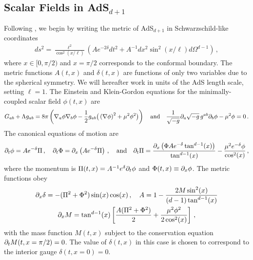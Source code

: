 \documentclass[../PhD.tex]{subfiles}
\begin{document}
\subsection{Scalar Fields in AdS$_{d+1}$}
Following \cite{1508.02709}, we begin by writing the metric of AdS$_{d+1}$ in Schwarzschild-like coordinates 
\begin{align}
ds^2 = \frac{\ell^2}{\cos^2 \left(x / \ell \right)} \left( A e^{-2\delta} dt^2 + A^{-1}dx^2 \sin^2 \left(x / \ell \right) d\Omega^{d-1} \right) \, ,
\end{align}
where $x \in [0, \pi/2)$ and $x = \pi / 2$ corresponds to the conformal boundary. The metric functions $A(t,x)$ and $\delta(t,x)$ are functions of only two variables due to the spherical symmetry. We will hereafter work in units of the AdS length scale, setting $\ell = 1$. The Einstein and Klein-Gordon equations for the minimally-coupled scalar field $\phi(t,x)$ are
\begin{align}
G_{ab} + \Lambda g_{ab} = 8\pi \left( \nabla_a \phi \nabla_b \phi - \frac{1}{2} g_{ab} \big( \left( \nabla \phi \right)^2 + \mu^2 \phi^2 \big) \right) \quad \text{and} \quad \frac{1}{\sqrt{-g}} \partial_a \sqrt{-g} \, g^{ab} \partial_b \phi - \mu^2 \phi = 0 \, .
\end{align}
The canonical equations of motion are \cite{1210.1566}
\begin{align}
\label{canon eqns}
\partial_t \phi = A e^{-\delta} \Pi \, , \quad \partial_t \Phi = \partial_x \left( A e^{-\delta} \Pi \right) \, , \quad \text{and} \quad \partial_t \Pi = \frac{\partial_x \left( \Phi A e^{-\delta} \tan^{d-1} (x) \right)}{\tan^{d-1}(x)} - \frac{\mu^2 e^{-\delta} \phi}{\cos^2 (x)} \, ,
\end{align}
where the momentum is $\Pi(t,x) = A^{-1} e^{\delta} \partial_t \phi$ and $\Phi(t,x) \equiv \partial_x \phi$. The metric functions obey
\begin{align}
\label{metric funcs}
\begin{gathered}
\partial_x \delta = - (\Pi^2 + \Phi^2 ) \sin (x) \cos(x) \, , \quad A = 1 - \frac{2M \sin^2 (x) }{(d-1) \tan^{d-1}(x)} \\
\partial_x M = \tan^{d-1}(x) \left[ \frac{A (\Pi^2 + \Phi^2)}{2} + \frac{\mu^2 \phi^2}{2 \cos^2 (x)} \right] \, ,
\end{gathered}
\end{align}
with the mass function $M(t,x)$ subject to the conservation equation $\partial_t M( t, x = \pi/2) = 0$. The value of $\delta(t,x)$ in this case is chosen to correspond to the interior gauge $\delta(t,x=0) = 0$. 
\end{document}
